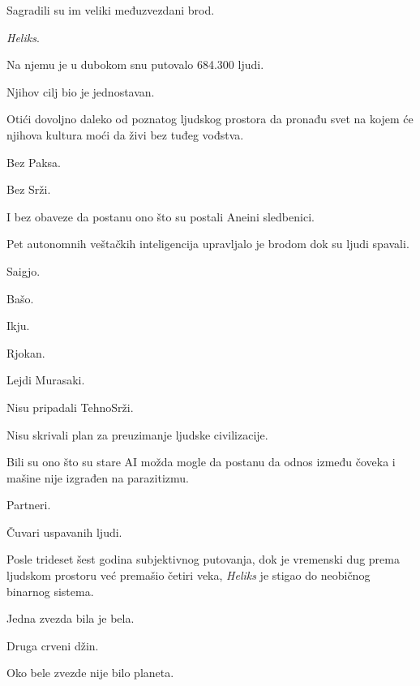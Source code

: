 Sagradili su im veliki međuzvezdani brod.

\emph{Heliks}.

\bigskip

Na njemu je u dubokom snu putovalo 684.300 ljudi.

\bigskip

Njihov cilj bio je jednostavan.

\bigskip

Otići dovoljno daleko od poznatog ljudskog prostora da pronađu svet na kojem će njihova kultura moći da živi bez tuđeg vođstva.

\bigskip

Bez Paksa.

Bez Srži.

\bigskip

I bez obaveze da postanu ono što su postali Aneini sledbenici.

\bigskip

Pet autonomnih veštačkih inteligencija upravljalo je brodom dok su ljudi spavali.

\bigskip

Saigjo.

Bašo.

Ikju.

Rjokan.

Lejdi Murasaki.

\bigskip

Nisu pripadali TehnoSrži.

\bigskip

Nisu skrivali plan za preuzimanje ljudske civilizacije.

\bigskip

Bili su ono što su stare AI možda mogle da postanu da odnos između čoveka i mašine nije izgrađen na parazitizmu.

\bigskip

Partneri.

\bigskip

Čuvari uspavanih ljudi.

\bigskip

Posle trideset šest godina subjektivnog putovanja, dok je vremenski dug prema ljudskom prostoru već premašio četiri veka, \emph{Heliks} je stigao do neobičnog binarnog sistema.

\bigskip

Jedna zvezda bila je bela.

Druga crveni džin.

\bigskip

Oko bele zvezde nije bilo planeta.

